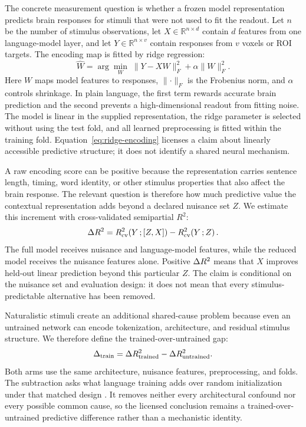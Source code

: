 The concrete measurement question is whether a frozen model representation predicts brain responses for stimuli that were not used to fit the readout.
Let $n$ be the number of stimulus observations, let $X\in\mathbb{R}^{n\times d}$ contain $d$ features from one language-model layer, and let $Y\in\mathbb{R}^{n\times v}$ contain responses from $v$ voxels or ROI targets.
The encoding map is fitted by ridge regression:
\begin{equation}
  \hat W = \arg\min_W \; \lVert Y-XW\rVert_F^2+\alpha\lVert W\rVert_F^2 .
  \label{eq:ridge-encoding}
\end{equation}
Here $W$ maps model features to responses, $\lVert\cdot\rVert_F$ is the Frobenius norm, and $\alpha$ controls shrinkage.
In plain language, the first term rewards accurate brain prediction and the second prevents a high-dimensional readout from fitting noise.
The model is linear in the supplied representation, the ridge parameter is selected without using the test fold, and all learned preprocessing is fitted within the training fold.
Equation~\ref{eq:ridge-encoding} licenses a claim about linearly accessible predictive structure; it does not identify a shared neural mechanism.

A raw encoding score can be positive because the representation carries sentence length, timing, word identity, or other stimulus properties that also affect the brain response.
The relevant question is therefore how much predictive value the contextual representation adds beyond a declared nuisance set $Z$.
We estimate this increment with cross-validated semipartial $R^2$:
\begin{equation}
  \Delta R^2 = R^2_{\mathrm{cv}}\!\left(Y\,;[Z,X]\right)-R^2_{\mathrm{cv}}\!\left(Y\,;Z\right).
  \label{eq:unique-r2}
\end{equation}
The full model receives nuisance and language-model features, while the reduced model receives the nuisance features alone.
Positive $\Delta R^2$ means that $X$ improves held-out linear prediction beyond this particular $Z$.
The claim is conditional on the nuisance set and evaluation design: it does not mean that every stimulus-predictable alternative has been removed.

Naturalistic stimuli create an additional shared-cause problem because even an untrained network can encode tokenization, architecture, and residual stimulus structure.
We therefore define the trained-over-untrained gap:
\begin{equation}
  \Delta_{\mathrm{train}}=\Delta R^2_{\mathrm{trained}}-\Delta R^2_{\mathrm{untrained}} .
  \label{eq:trained-gap}
\end{equation}
Both arms use the same architecture, nuisance features, preprocessing, and folds.
The subtraction asks what language training adds over random initialization under that matched design .
It removes neither every architectural confound nor every possible common cause, so the licensed conclusion remains a trained-over-untrained predictive difference rather than a mechanistic identity.

